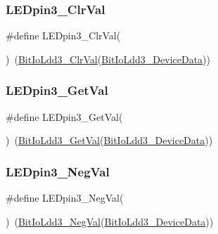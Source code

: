 \subsubsection{\texorpdfstring{L\+E\+Dpin3\+\_\+\+Clr\+Val}{LEDpin3\_ClrVal}}
{\footnotesize\ttfamily \#define L\+E\+Dpin3\+\_\+\+Clr\+Val(\begin{DoxyParamCaption}{ }\end{DoxyParamCaption})~(\hyperlink{group___bit_io_ldd3__module_gad1e5677bb374a68ea95ddac2e5b08503}{Bit\+Io\+Ldd3\+\_\+\+Clr\+Val}(\hyperlink{group___bit_io_ldd3__module_ga6c42610f82c903df15f7a2a286e3dae4}{Bit\+Io\+Ldd3\+\_\+\+Device\+Data}))}

\mbox{\label{group___l_e_dpin3__module_gab6cfe66ad8b299ff936ff5030d9960d5}} 
\subsubsection{\texorpdfstring{L\+E\+Dpin3\+\_\+\+Get\+Val}{LEDpin3\_GetVal}}
{\footnotesize\ttfamily \#define L\+E\+Dpin3\+\_\+\+Get\+Val(\begin{DoxyParamCaption}{ }\end{DoxyParamCaption})~(\hyperlink{group___bit_io_ldd3__module_gaf69704b3907d4685c381341b67daf0f2}{Bit\+Io\+Ldd3\+\_\+\+Get\+Val}(\hyperlink{group___bit_io_ldd3__module_ga6c42610f82c903df15f7a2a286e3dae4}{Bit\+Io\+Ldd3\+\_\+\+Device\+Data}))}

\mbox{\label{group___l_e_dpin3__module_ga7b7480d673eb2347ba54b6d7c93313aa}} 
\subsubsection{\texorpdfstring{L\+E\+Dpin3\+\_\+\+Neg\+Val}{LEDpin3\_NegVal}}
{\footnotesize\ttfamily \#define L\+E\+Dpin3\+\_\+\+Neg\+Val(\begin{DoxyParamCaption}{ }\end{DoxyParamCaption})~(\hyperlink{group___bit_io_ldd3__module_gaf2f93fab1bcb91f83a96805a4cdec84e}{Bit\+Io\+Ldd3\+\_\+\+Neg\+Val}(\hyperlink{group___bit_io_ldd3__module_ga6c42610f82c903df15f7a2a286e3dae4}{Bit\+Io\+Ldd3\+\_\+\+Device\+Data}))}

